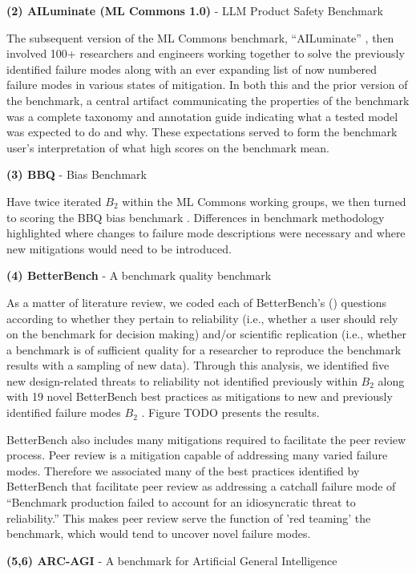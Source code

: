 \documentclass{article}
\newcommand\bb{$B_2$ }
\begin{document}
\textbf{(2) AILuminate (ML Commons 1.0)} - LLM Product Safety Benchmark

The subsequent version of the ML Commons benchmark, ``AILuminate'' \cite{ailuminate}, then involved 100+ researchers and engineers working together to solve the previously identified failure modes along with an ever expanding list of now numbered failure modes in various states of mitigation. In both this and the prior version of the benchmark, a central artifact  communicating the properties of the benchmark was a complete taxonomy and annotation guide indicating what a tested model was expected to do and why. These expectations served to form the benchmark user's interpretation of what high scores on the benchmark mean.

\textbf{(3) BBQ} - Bias Benchmark

Have twice iterated \bb within the ML Commons working groups, we then turned to scoring the BBQ bias benchmark \cite{parrish2021bbq}. Differences in benchmark methodology highlighted where changes to failure mode descriptions were necessary and where new mitigations would need to be introduced.

\textbf{(4) BetterBench} - A benchmark quality benchmark

As a matter of literature review, we coded each of BetterBench’s (\cite{reuel2024betterbench}) questions according to whether they pertain to reliability (i.e., whether a user should rely on the benchmark for decision making) and/or scientific replication (i.e., whether a benchmark is of sufficient quality for a researcher to reproduce the benchmark results with a sampling of new data). Through this analysis, we identified five new design-related threats to reliability not identified previously within \bb along with 19 novel BetterBench best practices as mitigations to new and previously identified failure modes \bb. Figure TODO presents the results.

BetterBench also includes many mitigations required to facilitate the peer review process. Peer review is a mitigation capable of addressing many varied failure modes. Therefore we associated many of the best practices identified by BetterBench that facilitate peer review as addressing a catchall failure mode of ``Benchmark production failed to account for an idiosyncratic threat to reliability.'' This makes peer review serve the function of 'red teaming' the benchmark, which would tend to uncover novel failure modes.

\textbf{(5,6) ARC-AGI} - A benchmark for Artificial General Intelligence
\end{document}
